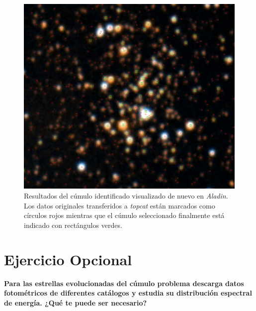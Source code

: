 \documentclass[a4paper,fleqn,usenatbib]{mnras}
\begin{document}
\begin{figure}
  \includegraphics[width=\linewidth]{img/b51_aladin}
  \caption{Resultados del cúmulo identificado visualizado de nuevo en \emph{Aladin}. Los datos originales transferidos a \emph{topcat} están marcados como círculos rojos mientras que el cúmulo seleccionado finalmente está indicado con rectángulos verdes.}
  \label{fig:e2_b51_aladin}
\end{figure}


\section{Ejercicio Opcional}

\textbf{Para las estrellas evolucionadas del cúmulo problema descarga datos fotométricos de diferentes catálogos y
estudia su distribución espectral de energía. ¿Qué te puede ser necesario?}













\bsp	%
\label{lastpage}
\end{document}
